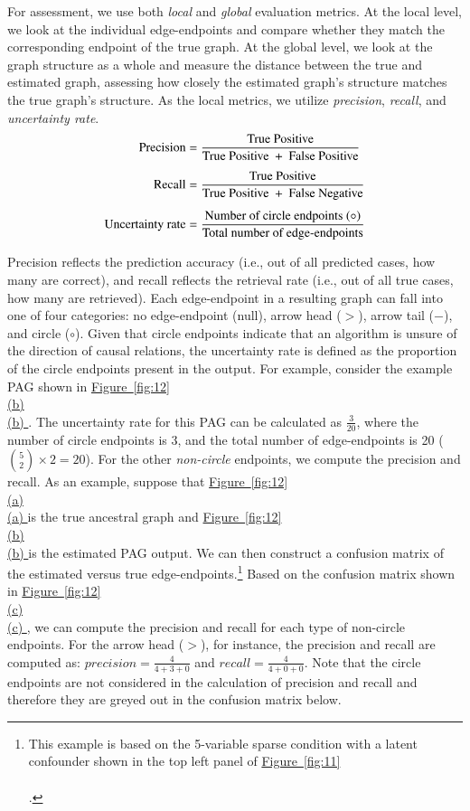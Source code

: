 \documentclass[twoside, 11pt]{article}
\newcommand*{\figref}[2][]{%
  \hyperref[{fig:#2}]{%
    Figure~\ref*{fig:#2}%
    \ifx\\#1\\%
    \else
      #1%
    \fi
  }%
}
\begin{document}
For assessment, we use both \textit{local} and \textit{global} evaluation metrics. At the local level, we look at the individual edge-endpoints and compare whether they match the corresponding endpoint of the true graph. At the global level, we look at the graph structure as a whole and measure the distance between the true and estimated graph, assessing how closely the estimated graph's structure matches the true graph's structure. As the local metrics, we utilize \textit{precision}, \textit{recall}, and \textit{uncertainty rate}.
\begin{align*}
\text{Precision} &= \frac{\text{True Positive}}{\text{True Positive } + \text{ False Positive}} \vspace{1mm} \\[1.1ex]
\text{Recall} &= \frac{\text{True Positive}}{\text{True Positive } + \text{ False Negative}} \\[1.1ex]
\text{Uncertainty rate} &= \frac{\text{Number of circle endpoints } (\circ)}{\text{Total number of edge-endpoints}}
\end{align*}

\noindent Precision reflects the prediction accuracy (i.e., out of all predicted cases, how many are correct), and recall reflects the retrieval rate (i.e., out of all true cases, how many are retrieved). Each edge-endpoint in a resulting graph can fall into one of four categories: no edge-endpoint (null), arrow head ($>$), arrow tail ($-$), and circle ($\circ$). Given that circle endpoints indicate that an algorithm is unsure of the direction of causal relations, the uncertainty rate is defined as the proportion of the circle endpoints present in the output. 
For example, consider the example PAG shown in \figref[(b)]{12}.
The uncertainty rate for this PAG can be calculated as $\frac{3}{20}$, where the number of circle endpoints is 3, and the total number of edge-endpoints is 20 ($ \binom{5}{2} \times 2 = 20$).
For the other \textit{non-circle} endpoints, we compute the precision and recall. As an example, suppose that \figref[(a)]{12} is the true ancestral graph and \figref[(b)]{12} is the estimated PAG output. We can then construct a confusion matrix of the estimated versus true edge-endpoints.\footnote{This example is based on the 5-variable sparse condition with a latent confounder shown in the top left panel of \figref[]{11}.} Based on the confusion matrix shown in \figref[(c)]{12}, we can compute the precision and recall for each type of non-circle endpoints. For the arrow head ($>$), for instance, the precision and recall are computed as: $precision =  \frac{4}{4 + 3 + 0}$ and $recall = \frac{4}{4 + 0 + 0}$. Note that the circle endpoints are not considered in the calculation of precision and recall and therefore they are greyed out in the confusion matrix below.
\end{document}
